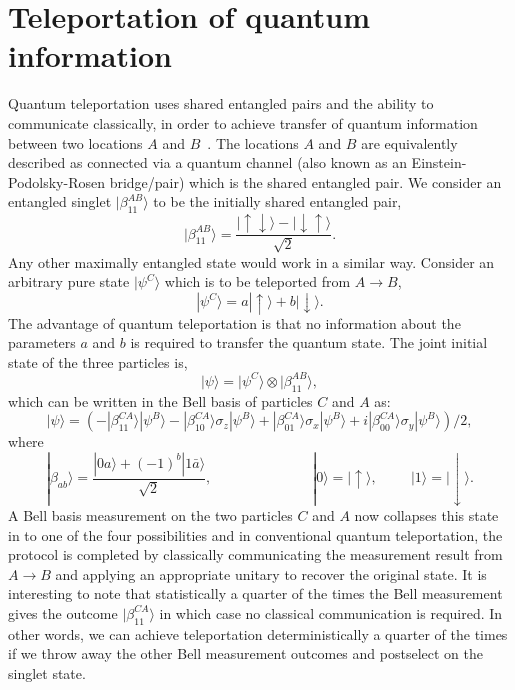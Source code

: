 \documentclass[10pt,letterpaper,aps,onecolumn,superscriptaddress,floatfix,notitlepage]{revtex4-1}
\begin{document}
	\section{Teleportation of quantum information\label{Ap:teleport}}
	Quantum teleportation uses shared entangled pairs and the ability to communicate classically, in order to achieve transfer of quantum information between two locations $A$ and $B$~\cite{bennett1993teleporting}. The locations $A$ and $B$ are equivalently described as connected via a quantum channel (also known as an Einstein-Podolsky-Rosen bridge/pair) which is the shared entangled pair. We consider an entangled singlet $|\beta^{AB}_{11}\rangle$ to be the initially shared entangled pair,
	\begin{equation}
	|\beta^{AB}_{11}\rangle = \frac{|\uparrow\downarrow\rangle-|\downarrow\uparrow\rangle}{\sqrt{2}}.
	\end{equation}
	Any other maximally entangled state would work in a similar way. Consider an arbitrary pure state $|\psi^{C}\rangle$ which is to be teleported from $A\rightarrow B$, 
	\begin{equation}|\psi^{C}\rangle = a|\uparrow\rangle + b|\downarrow\rangle.\end{equation}
	The advantage of quantum teleportation is that no information about the parameters $a$ and $b$ is required to transfer the quantum state. The joint initial state of the three particles is,
	\begin{equation}
	|\psi\rangle = |\psi^{C}\rangle\otimes|\beta^{AB}_{11}\rangle,
	\end{equation}
	which can be written in the Bell basis of particles $C$ and $A$ as:
	\begin{equation}\label{tp}|\psi\rangle = (-|\beta^{CA}_{11}\rangle|\psi^{B}\rangle-|\beta^{CA}_{10}\rangle\sigma_{z}|\psi^{B}\rangle+|\beta^{CA}_{01}\rangle\sigma_{x}|\psi^{B}\rangle+i|\beta^{CA}_{00}\rangle\sigma_{y}|\psi^{B}\rangle)/2,\end{equation}    
	where \begin{equation}|\beta_{ab}\rangle = \frac{|0a\rangle+(-1)^{b}|1\bar{a}\rangle}{\sqrt{2}},\hspace{1cm}\hspace{2cm}|0\rangle = |\uparrow\rangle,\hspace{1cm}|1\rangle = |\downarrow\rangle.\end{equation}
	A Bell basis measurement on the two particles $C$ and $A$ now collapses this state in to one of the four possibilities and in conventional quantum teleportation, the protocol is completed by classically communicating the measurement result from $A\rightarrow B$ and applying an appropriate unitary to recover the original state.  It is interesting to note that statistically a quarter of the times the Bell measurement gives the outcome $|\beta_{11}^{CA}\rangle$ in which case no classical communication is required. In other words, we can achieve teleportation deterministically a quarter of the times if we throw away the other Bell measurement outcomes and postselect on the singlet state.   
	
\end{document}
